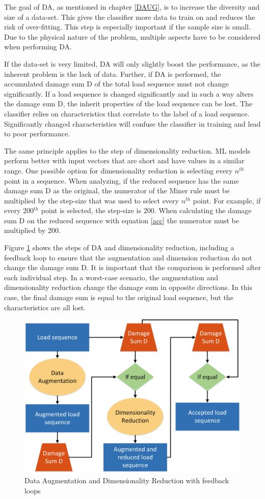 The goal of DA, as mentioned in chapter \ref{DAUG}, is to increase the diversity and size of a data-set. This gives the classifier more data to train on and reduces the risk of over-fitting.
This step is especially important if the sample size is small. Due to the physical nature of the problem, multiple aspects have to be considered when performing DA.

If the data-set is very limited, DA will only slightly boost the performance, as the inherent problem is the lack of data. Further, if DA is performed, the accumulated damage sum D of the total load sequence must not change significantly. If a load sequence is changed significantly and in such a way alters the damage sum D, the inherit properties of the load sequence can be lost. The classifier relies on characteristics that correlate to the label of a load sequence. Significantly changed characteristics will confuse the classifier in training and lead to poor performance.


The same principle applies to the step of dimensionality reduction. ML models perform better with input vectors that are short and have values in a similar range. One possible option for dimensionality reduction is selecting every \(n^{th}\) point in a sequence.
When analyzing, if the reduced sequence has the same damage sum D as the original, the numerator of the Miner rule must be multiplied by the step-size that was used to select every \(n^{th}\) point. For example, if every 200\(^{th}\) point is selected, the step-size is 200. When calculating the damage sum D on the reduced sequence with equation \ref{acc} the numerator must be multiplied by 200.


Figure \ref{fig:DAUG} shows the steps of DA and dimensionality reduction, including a feedback loop to ensure that the augmentation and dimension reduction do not change the damage sum D.
It is important that the comparison is performed after each individual step. In a worst-case scenario, the augmentation and dimensionality reduction change the damage sum in opposite directions. In this case, the final damage sum is equal to the original load sequence, but the characteristics are all lost.

 
\begin{figure}[H]
	\centering
	\includegraphics[width=0.8\linewidth]{IMGs/DAUG.png}
	\caption{Data Augmentation and Dimensionality Reduction with feedback loops}
	\label{fig:DAUG}
\end{figure}

